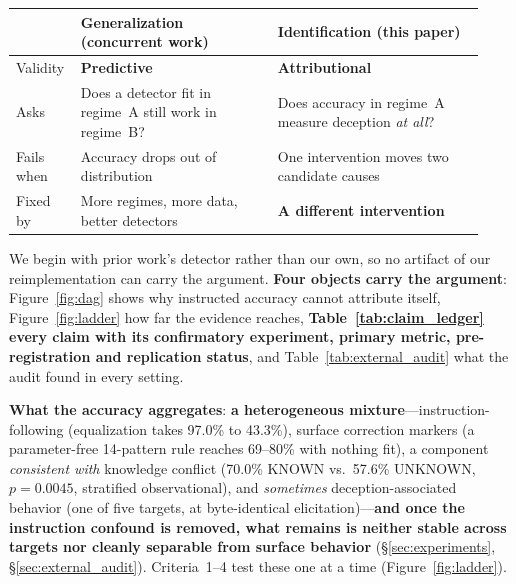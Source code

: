 \begin{center}\small
\setlength{\tabcolsep}{3pt}
\begin{tabular}{@{}p{0.11\linewidth}p{0.40\linewidth}p{0.42\linewidth}@{}}
\toprule
 & \textbf{Generalization} (concurrent work) & \textbf{Identification} (this paper) \\
\midrule
Validity & \textbf{Predictive} & \textbf{Attributional} \\
Asks & Does a detector fit in regime~A still work in regime~B? & Does accuracy in regime~A measure deception \emph{at all}? \\
Fails when & Accuracy drops out of distribution & One intervention moves two candidate causes \\
Fixed by & More regimes, more data, better detectors & \textbf{A different intervention} \\
\bottomrule
\end{tabular}
\end{center}

We begin with prior work's detector rather than our own, so no artifact of our reimplementation can carry the argument. \textbf{Four objects carry the argument}: Figure~\ref{fig:dag} shows why instructed accuracy cannot attribute itself, Figure~\ref{fig:ladder} how far the evidence reaches, \textbf{Table~\ref{tab:claim_ledger} every claim with its confirmatory experiment, primary metric, pre-registration and replication status}, and Table~\ref{tab:external_audit} what the audit found in every setting.

\noindent{}

\noindent\textbf{What the accuracy aggregates}: \textbf{a heterogeneous mixture}---instruction-following (equalization takes 97.0\% to 43.3\%), surface correction markers (a parameter-free 14-pattern rule reaches 69--80\% with nothing fit), a component \emph{consistent with} knowledge conflict (70.0\% KNOWN vs.\ 57.6\% UNKNOWN, $p\!=\!0.0045$, stratified observational), and \emph{sometimes} deception-associated behavior (one of five targets, at byte-identical elicitation)---\textbf{and once the instruction confound is removed, what remains is neither stable across targets nor cleanly separable from surface behavior} (§\ref{sec:experiments}, §\ref{sec:external_audit}). Criteria~1--4 test these one at a time (Figure~\ref{fig:ladder}).


